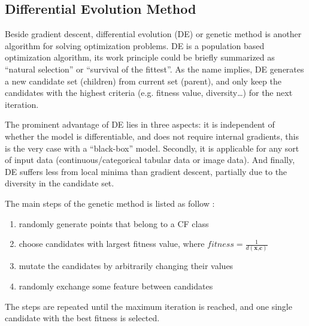 \subsection{Differential Evolution Method}
Beside gradient descent, differential evolution (DE) or genetic method is another algorithm for solving optimization problems. DE is a population based optimization algorithm, its work principle could be briefly summarized as ``natural selection'' or ``survival of the fittest''. As the name implies, DE generates a new candidate set (children) from current set (parent), and only keep the candidates with the highest criteria (e.g. fitness value, diversity\dots) for the next iteration.

The prominent advantage of DE lies in three aspects: it is independent of whether the model is differentiable, and does not require internal gradients, this is the very case with a ``black-box'' model. Secondly, it is applicable for any sort of input data (continuous/categorical tabular data or image data). And finally, DE suffers less from local minima than gradient descent, partially due to the diversity in the candidate set.

The main steps of the genetic method is listed as follow \cite{certifai}:
\begin{enumerate}
  \item randomly generate points that belong to a CF class
  \item choose candidates with largest fitness value, where $fitness=\frac{1}{d(\textbf{x,c})}$
  \item mutate the candidates by arbitrarily changing their values
  \item randomly exchange some feature between candidates
\end{enumerate}
The steps are repeated until the maximum iteration is reached, and one single candidate with the best fitness is selected.

